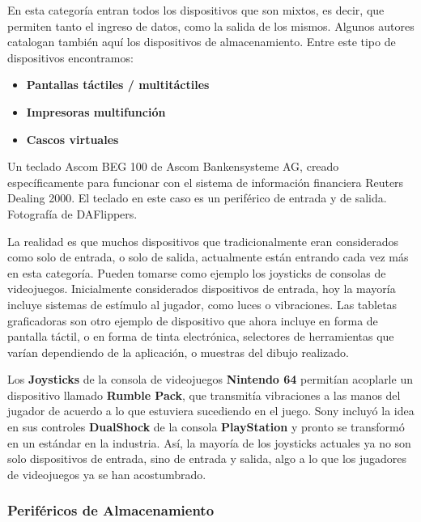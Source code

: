 En esta categoría entran todos los dispositivos que son mixtos, es decir, que
permiten tanto el ingreso de datos, como la salida de los mismos. Algunos
autores catalogan también aquí los dispositivos de almacenamiento.\autocite[p.
246]{laplante_2000} Entre este tipo de dispositivos encontramos:
\begin{itemize}
    \item \textbf{Pantallas táctiles / multitáctiles}
    \item \textbf{Impresoras multifunción}
    \item \textbf{Cascos virtuales}
\end{itemize}

{Un teclado Ascom BEG 100 de Ascom Bankensysteme AG, creado específicamente para
funcionar con el sistema de información financiera Reuters Dealing 2000. El
teclado en este caso es un periférico de entrada y de salida.} {Fotografía de
DAFlippers.}

La realidad es que muchos dispositivos que tradicionalmente eran considerados
como solo de entrada, o solo de salida, actualmente están entrando cada vez más
en esta categoría. Pueden tomarse como ejemplo los joysticks de consolas de
videojuegos. Inicialmente considerados dispositivos de entrada, hoy la mayoría
incluye sistemas de estímulo al jugador, como luces o vibraciones. Las tabletas
graficadoras son otro ejemplo de dispositivo que ahora incluye en forma de
pantalla táctil, o en forma de tinta electrónica, selectores de herramientas que
varían dependiendo de la aplicación, o muestras del dibujo realizado.

\begin{knowwhat}
Los \textbf{Joysticks} de la consola de videojuegos \textbf{Nintendo 64}
permitían acoplarle un dispositivo llamado \textbf{Rumble Pack}, que transmitía
vibraciones a las manos del jugador de acuerdo a lo que estuviera sucediendo en
el juego. Sony incluyó la idea en sus controles \textbf{DualShock} de la consola
\textbf{PlayStation} y pronto se transformó en un estándar en la industria. Así,
la mayoría de los joysticks actuales ya no son solo dispositivos de entrada,
sino de entrada y salida, algo a lo que los jugadores de videojuegos ya se han
acostumbrado.
\end{knowwhat}

\subsubsection*{Periféricos de Almacenamiento}
\label{chap:computadoras:subsubsec:perifericos_almacenamiento}

